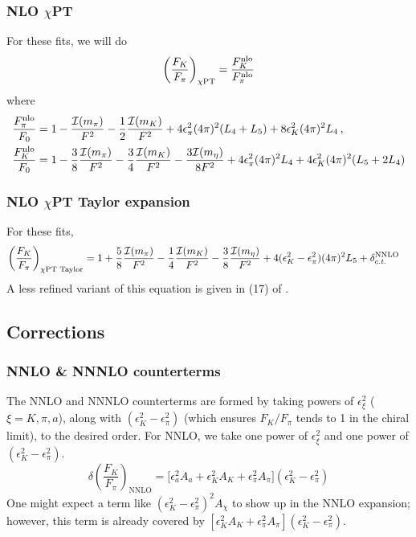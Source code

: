 \documentclass[prd,tightenlines,preprintnumbers,showpacs,superscriptaddress,notitlepage,eqsecnum,floatfix,notitlepage]{revtex4-1}
\begin{document}
\subsubsection{NLO $\chi$PT}
For these fits, we will do
\begin{equation}
\left(\frac{F_K}{F_\pi}\right)_\text{$\chi$PT} = \frac{F_K^{\rm nlo}}{F_\pi^{\rm nlo}}
\end{equation}
where
\begin{align}
\frac{F_\pi^{\rm nlo}}{F_0} &= 1
- \frac{\mathcal{I}(m_\pi)}{F^2}
-\frac{1}{2}\frac{\mathcal{I}(m_K)}{F^2}
+4 \epsilon_\pi^2 (4\pi)^2 (L_4 + L_5)
+8 \epsilon_K^2 (4\pi)^2 L_4 \, , \\
\frac{F_K^{\rm nlo}}{F_0} &= 1
-\frac{3}{8}\frac{\mathcal{I}(m_\pi)}{F^2}
-\frac{3}{4}\frac{\mathcal{I}(m_K)}{F^2}
-\frac{3\mathcal{I}(m_\eta)}{8F^2}
+4\epsilon_\pi^2 (4 \pi)^2  L_4 + 4\epsilon_K^2 (4 \pi)^2  (L_5 + 2L_4)
\end{align}


\subsubsection{NLO $\chi$PT Taylor expansion}
For these fits,
\begin{align}\label{eq:fkfpi_chpt}
\left(\frac{F_K}{F_\pi}\right)_\text{$\chi$PT Taylor} &= 1
+\frac{5}{8} \frac{\mathcal{I}(m_\pi)}{F^2}
-\frac{1}{4} \frac{\mathcal{I}(m_K)}{F^2}
-\frac{3}{8} \frac{\mathcal{I}(m_\eta)}{F^2}
+4(\epsilon_K^2 - \epsilon_\pi^2) (4\pi)^2 L_5
+ \delta_{c.t.}^{\rm NNLO}
\end{align}
A less refined variant of this equation is given in (17) of \cite{Berkowitz:2017opd}.


\subsection{Corrections}

\subsubsection{NNLO \& NNNLO counterterms}
The NNLO and NNNLO counterterms are formed by taking powers of $\epsilon^2_\xi$ ($\xi = K, \pi, a$), along with $(\epsilon_K^2 - \epsilon_\pi^2)$ (which ensures $F_K / F_\pi$ tends to 1 in the chiral limit), to the desired order. For NNLO, we take one power of $\epsilon^2_\xi$ and one power of $(\epsilon_K^2 - \epsilon_\pi^2)$.
\begin{equation}
\delta\left(\frac{F_K}{F_\pi}\right)_\text{NNLO} = \bigg[
\epsilon_a^2  A_{a}
+\epsilon_K^2  A_{K}
+\epsilon_\pi^2  A_{\pi}
\bigg] (\epsilon_K^2 - \epsilon_\pi^2)
\end{equation}
One might expect a term like $(\epsilon_K^2 - \epsilon_\pi^2)^2 A_{\chi}$ to show up in the NNLO expansion; however, this term is already covered by $[\epsilon_K^2  A_{K}+\epsilon_\pi^2  A_{\pi}] (\epsilon_K^2 - \epsilon_\pi^2)$.
\end{document}
